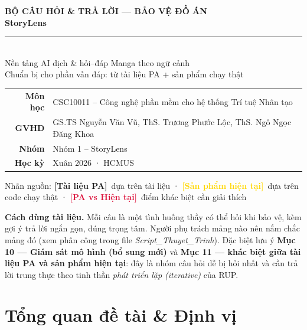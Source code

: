 \documentclass[11pt]{article}
\newcommand{\tagPA}{\textcolor{steel}{\footnotesize\textbf{[Tài liệu PA]}}}
\newcommand{\tagSP}{\textcolor{gold}{\footnotesize\textbf{[Sản phẩm hiện tại]}}}
\newcommand{\tagBoth}{\textcolor{crimson}{\footnotesize\textbf{[PA vs Hiện tại]}}}
\begin{document}
\begin{titlepage}
\centering
\vspace*{2.2cm}
{\headfont\bfseries\fontsize{15}{18}\selectfont\textcolor{soft}{BỘ CÂU HỎI \& TRẢ LỜI — BẢO VỆ ĐỒ ÁN}}\\[6pt]
{\headfont\bfseries\fontsize{46}{50}\selectfont\textcolor{ink}{StoryLens}}\\[10pt]
{\color{crimson}\rule{9cm}{2pt}}\\[10pt]
{\large Nền tảng AI dịch \& hỏi--đáp Manga theo ngữ cảnh}\\[4pt]
{\color{soft}\large Chuẩn bị cho phần vấn đáp: từ tài liệu PA + sản phẩm chạy thật}\\[2.4cm]
\begin{tabular}{rl}
\textbf{Môn học} & CSC10011 -- Công nghệ phần mềm cho hệ thống Trí tuệ Nhân tạo\\[3pt]
\textbf{GVHD} & GS.TS Nguyễn Văn Vũ, ThS. Trương Phước Lộc, ThS. Ngô Ngọc Đăng Khoa\\[3pt]
\textbf{Nhóm} & Nhóm 1 -- StoryLens\\[3pt]
\textbf{Học kỳ} & Xuân 2026 · HCMUS\\
\end{tabular}
\vfill
{\color{soft}\small Nhãn nguồn: \tagPA\ dựa trên tài liệu · \tagSP\ dựa trên code chạy thật · \tagBoth\ điểm khác biệt cần giải thích}
\end{titlepage}

\tableofcontents
\newpage

\begin{tcolorbox}[colback=gold!8,colframe=gold,sharp corners,boxrule=0.6pt]
\small\textbf{Cách dùng tài liệu.} Mỗi câu là một tình huống thầy có thể hỏi khi bảo vệ, kèm gợi ý trả lời ngắn gọn, đúng trọng tâm. Người phụ trách mảng nào nên nắm chắc mảng đó (xem phân công trong file \textit{Script\_Thuyet\_Trinh}). Đặc biệt lưu ý \textbf{Mục 10 --- Giám sát mô hình (bổ sung mới)} và \textbf{Mục 11 --- khác biệt giữa tài liệu PA và sản phẩm hiện tại}: đây là nhóm câu hỏi dễ bị hỏi nhất và cần trả lời trung thực theo tinh thần \textit{phát triển lặp (iterative)} của RUP.
\end{tcolorbox}

\section{Tổng quan đề tài \& Định vị}
\end{document}
